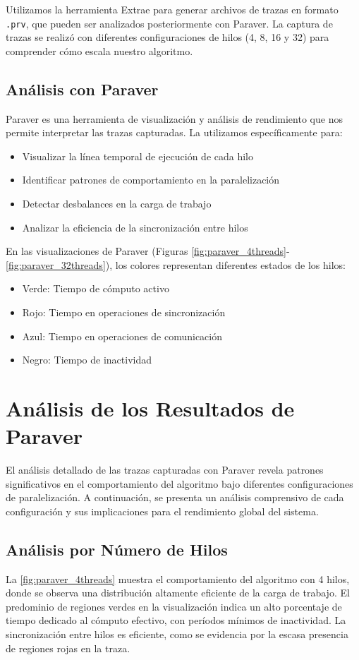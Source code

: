 \documentclass[a4paper, 10pt, onecolumn]{IEEEtran}
\begin{document}
Utilizamos la herramienta Extrae \cite{mpi2prv} para generar archivos de trazas en formato \texttt{.prv}, que pueden ser analizados posteriormente con Paraver. La captura de trazas se realizó con diferentes configuraciones de hilos (4, 8, 16 y 32) para comprender cómo escala nuestro algoritmo.

\subsection{Análisis con Paraver}
Paraver \cite{paraver} es una herramienta de visualización y análisis de rendimiento que nos permite interpretar las trazas capturadas. La utilizamos específicamente para:

\begin{itemize}
  \item Visualizar la línea temporal de ejecución de cada hilo
  \item Identificar patrones de comportamiento en la paralelización
  \item Detectar desbalances en la carga de trabajo
  \item Analizar la eficiencia de la sincronización entre hilos
\end{itemize}

En las visualizaciones de Paraver (Figuras \ref{fig:paraver_4threads}-\ref{fig:paraver_32threads}), los colores representan diferentes estados de los hilos:
\begin{itemize}
  \item Verde: Tiempo de cómputo activo
  \item Rojo: Tiempo en operaciones de sincronización
  \item Azul: Tiempo en operaciones de comunicación
  \item Negro: Tiempo de inactividad
\end{itemize}

\section{Análisis de los Resultados de Paraver}
El análisis detallado de las trazas capturadas con Paraver revela patrones significativos en el comportamiento del algoritmo bajo diferentes configuraciones de paralelización. A continuación, se presenta un análisis comprensivo de cada configuración y sus implicaciones para el rendimiento global del sistema.

\subsection{Análisis por Número de Hilos}
La \cref{fig:paraver_4threads} muestra el comportamiento del algoritmo con 4 hilos, donde se observa una distribución altamente eficiente de la carga de trabajo. El predominio de regiones verdes en la visualización indica un alto porcentaje de tiempo dedicado al cómputo efectivo, con períodos mínimos de inactividad. La sincronización entre hilos es eficiente, como se evidencia por la escasa presencia de regiones rojas en la traza.
\end{document}
